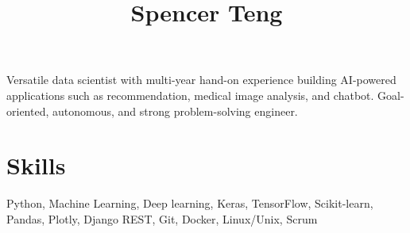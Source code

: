 \documentclass[11pt]{article} %
\begin{document}
{\selectfont



\hspace{-1.2em}\title{ Spencer Teng } %

\noindent\begin{minipage}[t]{0.8\textwidth}
\vspace{1em}

Versatile data scientist with multi-year hand-on experience building AI-powered applications such
as recommendation, medical image analysis, and chatbot. Goal-oriented, autonomous,
and strong problem-solving engineer. 


\section{Skills}

Python, Machine Learning, Deep learning, Keras, TensorFlow, Scikit-learn, Pandas, Plotly, Django REST, Git, Docker, Linux/Unix, Scrum


\end{minipage}\hspace{1mm}
\begin{minipage}[t]{0.22\textwidth}




\end{minipage}}
\end{document}
